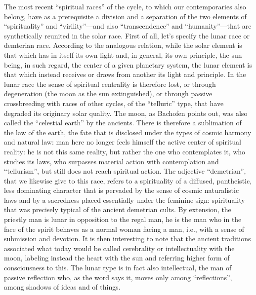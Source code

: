 The most recent ``spiritual races'' of the cycle, to which our contemporaries also belong, have as a prerequisite a division and a separation of the two elements of ``spirituality'' and ``virility''---and also ``transcendence'' and ``humanity''---that are synthetically reunited in the solar race. First of all, let's specify the lunar race or demterian race. According to the analogous relation, while the solar element is that which has in itself its own light and, in general, its own principle, the sun being, in such regard, the center of a given planetary system, the lunar element is that which instead receives or draws from another its light and principle. In the lunar race the sense of spiritual centrality is therefore lost, or through degeneration (the moon as the sun extinguished), or through passive crossbreeding with races of other cycles, of the ``telluric'' type, that have degraded its originary solar quality. The moon, as Bachofen points out, was also called the ``celestial earth'' by the ancients. There is therefore a sublimation of the law of the earth, the fate that is disclosed under the types of cosmic harmony and natural law: man here no longer feels himself the active center of spiritual reality: he is not this same reality, but rather the one who contemplates it, who studies its laws, who surpasses material action with contemplation and ``tellurism'', but still does not reach spiritual action. The adjective ``demetrian'', that we likewise give to this race, refers to a spirituality of a diffused, pantheistic, less dominating character that is pervaded by the sense of cosmic naturalistic laws and by a sacredness placed essentially under the feminine sign: spirituality that was precisely typical of the ancient demetrian cults. By extension, the priestly man is lunar in opposition to the regal man, he is the man who in the face of the spirit behaves as a normal woman facing a man, i.e., with a sense of submission and devotion. It is then interesting to note that the ancient traditions associated what today would be called cerebrality or intellectuality with the moon, labeling instead the heart with the sun and referring higher form of consciousness to this. The lunar type is in fact also intellectual, the man of passive reflection who, as the word says it, moves only among ``reflections'', among shadows of ideas and of things.

